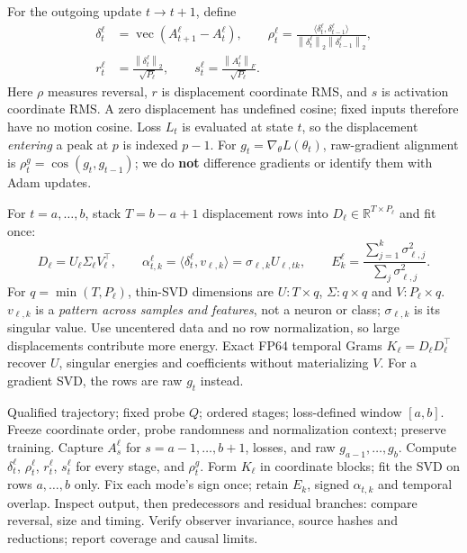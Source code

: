 \documentclass[11pt,a4paper]{article}
\newcommand{\R}{\mathbb R}
\newcommand{\vecop}{\operatorname{vec}}
\newcommand{\norm}[1]{\left\lVert#1\right\rVert}
\begin{document}
For the outgoing update $t\to t+1$, define
\begin{equation}
\begin{split}
\delta_t^\ell&=\vecop(A_{t+1}^\ell-A_t^\ell),\qquad
\rho_t^\ell=\frac{\langle\delta_t^\ell,\delta_{t-1}^\ell\rangle}
 {\norm{\delta_t^\ell}_2\norm{\delta_{t-1}^\ell}_2},\\
r_t^\ell&=\frac{\norm{\delta_t^\ell}_2}{\sqrt{P_\ell}},\qquad
s_t^\ell=\frac{\norm{A_t^\ell}_F}{\sqrt{P_\ell}}.
\end{split}\label{eq:motion}
\end{equation}
Here $\rho$ measures reversal, $r$ is displacement coordinate RMS, and $s$ is
activation coordinate RMS. A zero displacement has undefined cosine; fixed inputs
therefore have no motion cosine. Loss $L_t$ is evaluated at state $t$, so the
displacement \emph{entering} a peak at $p$ is indexed $p-1$.
For $g_t=\nabla_\theta L(\theta_t)$, raw-gradient alignment is $\rho_t^g=\cos(g_t,g_{t-1})$;
we do \textbf{not} difference gradients or identify them with Adam updates.

For $t=a,\ldots,b$, stack $T=b-a+1$ displacement rows into
$D_\ell\in\R^{T\times P_\ell}$ and fit once:
\begin{equation}
D_\ell=U_\ell\Sigma_\ell V_\ell^\top,\qquad
\alpha_{t,k}^\ell=\langle\delta_t^\ell,v_{\ell,k}\rangle
=\sigma_{\ell,k}U_{\ell,tk},\qquad
E_k^\ell=\frac{\sum_{j=1}^k\sigma_{\ell,j}^2}{\sum_j\sigma_{\ell,j}^2}.
\label{eq:svd}
\end{equation}
For $q=\min(T,P_\ell)$, thin-SVD dimensions are $U:T\times q$,
$\Sigma:q\times q$ and $V:P_\ell\times q$.
$v_{\ell,k}$ is a \emph{pattern across samples and features}, not a neuron or
class; $\sigma_{\ell,k}$ is its singular value. Use uncentered data and no row
normalization, so large displacements contribute more energy. Exact FP64 temporal
Grams $K_\ell=D_\ell D_\ell^\top$ recover $U$, singular energies and coefficients
without materializing $V$. For a gradient SVD, the rows are raw $g_t$ instead.

\begin{algorithm}[H]
\caption{Fixed-probe architectural oscillation tracing}\label{alg:trace}
\small
\begin{algorithmic}[1]
\Require Qualified trajectory; fixed probe $Q$; ordered stages; loss-defined window $[a,b]$.
\State Freeze coordinate order, probe randomness and normalization context; preserve training.
\State Capture $A_s^\ell$ for $s=a-1,\ldots,b+1$, losses, and raw $g_{a-1},\ldots,g_b$.
  \State Compute $\delta_t^\ell$, $\rho_t^\ell$, $r_t^\ell$, $s_t^\ell$ for every stage, and $\rho_t^g$.
\EndFor
{}
  \State Form $K_\ell$ in coordinate blocks; fit the SVD on rows $a,\ldots,b$ only.
  \State Fix each mode's sign once; retain $E_k$, signed $\alpha_{t,k}$ and temporal overlap.
\EndFor
\State Inspect output, then predecessors and residual branches: compare reversal, size and timing.
\State Verify observer invariance, source hashes and reductions; report coverage and causal limits.
\end{algorithmic}
\end{algorithm}
\end{document}
